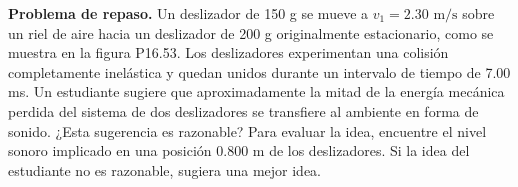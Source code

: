 \item \textbf{Problema de repaso.}
Un deslizador de 150 g se mueve a $v_1 = 2.30\text{ m/s}$ sobre un riel de aire hacia un deslizador de 200 g originalmente estacionario, como se muestra en la figura P16.53. Los deslizadores experimentan una colisión completamente inelástica y quedan unidos durante un intervalo de tiempo de 7.00 ms. Un estudiante sugiere que aproximadamente la mitad de la energía mecánica perdida del sistema de dos deslizadores se transfiere al ambiente en forma de sonido. ¿Esta sugerencia es razonable? Para evaluar la idea, encuentre el nivel sonoro implicado en una posición 0.800 m de los deslizadores. Si la idea del estudiante no es razonable, sugiera una mejor idea.